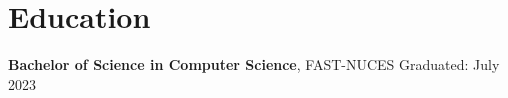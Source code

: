 \documentclass[11pt]{article}
\begin{document}
\section{Education}
\textbf{Bachelor of Science in Computer Science}, FAST-NUCES \hfill Graduated: July 2023 \\


\end{document}

